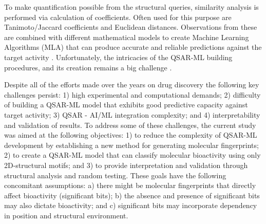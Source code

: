 To make quantification possible from the structural queries, similarity analysis is performed via calculation of coefficients. Often used for this purpose are Tanimoto/Jaccard coefficients and Euclidean distances. Observations from these are combined with different mathematical models to create Machine Learning Algorithms (MLA) that can produce accurate and reliable predictions against the target activity \cite{keith2021qSAR}. Unfortunately, the intricacies of the QSAR-ML building procedures, and its creation remains a big challenge \cite{gao2023uni-qsar}.

Despite all of the efforts made over the years on drug discovery the following key challenges persist: 1) high experimental and computational demands; 2) difficulty of building a QSAR-ML model that exhibits good predictive capacity against target activity; 3) QSAR - AI/ML integration complexity; and 4) interpretability and validation of results. To address some of these challenges, the current study was aimed at the following objectives: 1) to reduce the complexity of QSAR-ML development by establishing a new method for generating molecular fingerprints; 2) to create a QSAR-ML model that can classify molecular bioactivity using only 2D-structural motifs; and 3) to provide interpretation and validation through structural analysis and random testing. These goals have the following concomitant assumptions: a) there might be molecular fingerprints that directly affect  bioactivity (significant bits); b) the absence and presence of significant bits may also dictate bioactivity; and c) significant bits may incorporate dependency in position and structural environment.    



